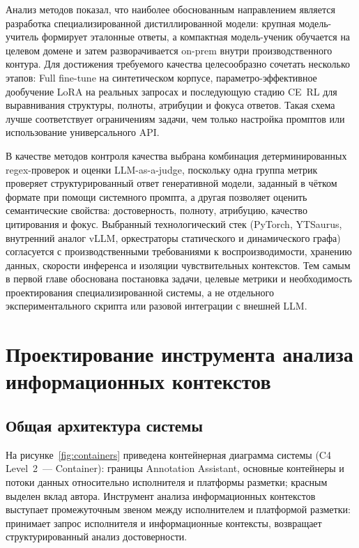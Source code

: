 \documentclass[times]{itmo-student-thesis}
\begin{document}
Анализ методов показал, что наиболее обоснованным направлением является
разработка специализированной дистиллированной модели: крупная модель-учитель
формирует эталонные ответы, а компактная модель-ученик обучается на целевом
домене и затем разворачивается on-prem внутри производственного контура.
Для достижения требуемого качества целесообразно сочетать несколько этапов:
Full fine-tune на синтетическом корпусе, параметро-эффективное дообучение
LoRA на реальных запросах и последующую стадию CE~RL для выравнивания
структуры, полноты, атрибуции и фокуса ответов. Такая схема лучше соответствует
ограничениям задачи, чем только настройка промптов или использование
универсального API.

В качестве методов контроля качества выбрана комбинация детерминированных
regex-проверок и оценки LLM-as-a-judge, поскольку одна группа метрик
проверяет структурированный ответ генеративной модели, заданный в чётком
формате при помощи системного промпта, а другая позволяет оценить семантические
свойства: достоверность, полноту, атрибуцию, качество цитирования и фокус.
Выбранный технологический стек (PyTorch, YTSaurus, внутренний аналог
vLLM, оркестраторы статического и динамического графа) согласуется с
производственными требованиями к воспроизводимости, хранению данных,
скорости инференса и изоляции чувствительных контекстов. Тем самым в первой
главе обоснована постановка задачи, целевые метрики и необходимость
проектирования специализированной системы, а не отдельного экспериментального
скрипта или разовой интеграции с внешней LLM.

\chapter{Проектирование инструмента анализа информационных контекстов}

\section{Общая архитектура системы}

На рисунке~\ref{fig:containers} приведена контейнерная диаграмма системы
(C4 Level~2~--- Container): границы Annotation Assistant, основные контейнеры
и потоки данных относительно исполнителя и платформы разметки; красным выделен
вклад автора.
Инструмент анализа информационных контекстов выступает промежуточным
звеном между исполнителем и платформой разметки: принимает запрос
исполнителя и информационные контексты, возвращает структурированный
анализ достоверности.
\end{document}
